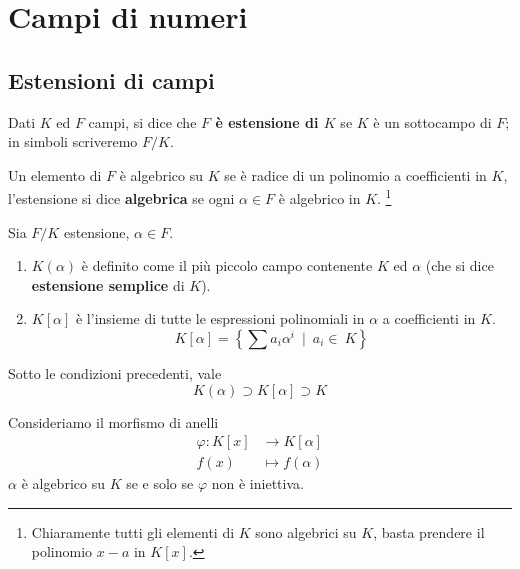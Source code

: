 \section{Campi di numeri}
\subsection{Estensioni di campi}
\label{lezione15}
\begin{definizione}
	Dati $K$ ed $F$ campi, si dice che \textbf{$F$ è estensione di $K$} se $K$ è un sottocampo di $F$; in simboli scriveremo $F/K$.
\end{definizione}
\begin{definizione}
	Un elemento di $F$ è algebrico su $K$ se è radice di un polinomio a coefficienti in $K$, l'estensione si dice \textbf{algebrica} se ogni $\alpha\in F$ è algebrico in $K$. \footnote{Chiaramente tutti gli elementi di $K$ sono algebrici su $K$, 
		basta prendere il polinomio $x-a$ in $K[x]$.}
\end{definizione}
\begin{definizione}
	Sia $F/K$ estensione, $\alpha\in F$.
	\begin{enumerate}
		\item $K(\alpha)$ è definito come il più piccolo campo contenente $K$ ed $\alpha$ (che si dice \textbf{estensione semplice} di $K$).
		\item $K[\alpha]$ è l'insieme di tutte le espressioni polinomiali in $\alpha$ a coefficienti in $K$.
		\begin{equation*}
		K[\alpha]=\left\{\sum a_i\alpha^i \ \mid \ a_i\in\ K\right\}
		\end{equation*}
	\end{enumerate}
\end{definizione}
\begin{proposizione} 
	Sotto le condizioni precedenti, vale
	\begin{equation*}
	K(\alpha)\supset K[\alpha] \supset K
	\end{equation*}
\end{proposizione}
\begin{proposizione}
	Consideriamo il morfismo di anelli 
	\begin{align*}
	\varphi: K[x] &\longrightarrow K[\alpha]\\
	f(x)&\longmapsto f(\alpha)
	\end{align*}
	$\alpha$ è algebrico su $K$ se e solo se $\varphi$ non è iniettiva.
\end{proposizione}
